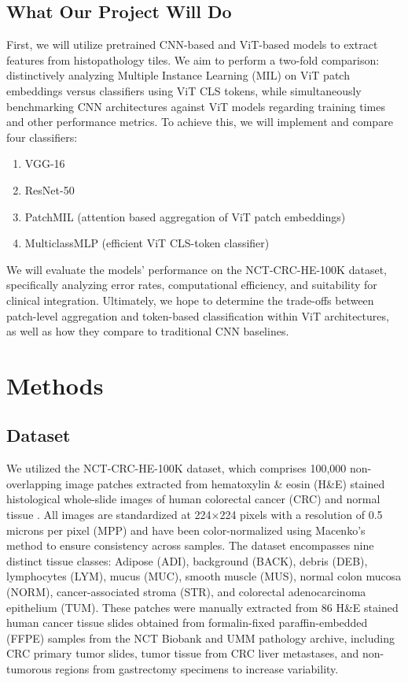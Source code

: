 \documentclass[a4paper,12pt]{article}
\begin{document}
\subsection{What Our Project Will Do}
First, we will utilize pretrained CNN-based and ViT-based models to extract features from histopathology tiles. We aim to perform a two-fold comparison: distinctively analyzing Multiple Instance Learning (MIL) on ViT patch embeddings versus classifiers using ViT CLS tokens, while simultaneously benchmarking CNN architectures against ViT models regarding training times and other performance metrics. To achieve this, we will implement and compare four classifiers: \begin{enumerate} \item VGG-16 \item ResNet-50 \item PatchMIL (attention based aggregation of ViT patch embeddings) \item MulticlassMLP (efficient ViT CLS-token classifier) \end{enumerate} We will evaluate the models' performance on the NCT-CRC-HE-100K dataset, specifically analyzing error rates, computational efficiency, and suitability for clinical integration. Ultimately, we hope to determine the trade-offs between patch-level aggregation and token-based classification within ViT architectures, as well as how they compare to traditional CNN baselines.


\section{Methods}

\subsection{Dataset}
We utilized the NCT-CRC-HE-100K dataset, which comprises 100,000 non-overlapping image patches extracted from hematoxylin \& eosin (H\&E) stained histological whole-slide images of human colorectal cancer (CRC) and normal tissue \cite{kather_100000_2018}. All images are standardized at 224$\times$224 pixels with a resolution of 0.5 microns per pixel (MPP) and have been color-normalized using Macenko's method to ensure consistency across samples. The dataset encompasses nine distinct tissue classes: Adipose (ADI), background (BACK), debris (DEB), lymphocytes (LYM), mucus (MUC), smooth muscle (MUS), normal colon mucosa (NORM), cancer-associated stroma (STR), and colorectal adenocarcinoma epithelium (TUM). These patches were manually extracted from 86 H\&E stained human cancer tissue slides obtained from formalin-fixed paraffin-embedded (FFPE) samples from the NCT Biobank and UMM pathology archive, including CRC primary tumor slides, tumor tissue from CRC liver metastases, and non-tumorous regions from gastrectomy specimens to increase variability.
\end{document}
